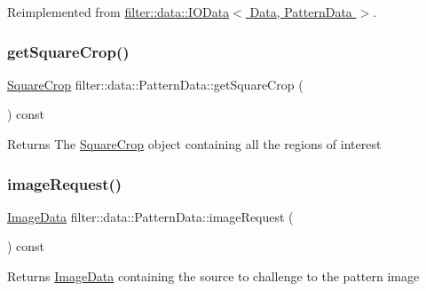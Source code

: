 Reimplemented from \hyperlink{classfilter_1_1data_1_1_i_o_data}{filter\+::data\+::\+I\+O\+Data$<$ Data, Pattern\+Data $>$}.

\mbox{\label{classfilter_1_1data_1_1_pattern_data_ad51b9505b78d94b5fac9e4afa83c087e}} 
\subsubsection{\texorpdfstring{get\+Square\+Crop()}{getSquareCrop()}}
{\footnotesize\ttfamily \hyperlink{classfilter_1_1data_1_1_square_crop}{Square\+Crop} filter\+::data\+::\+Pattern\+Data\+::get\+Square\+Crop (\begin{DoxyParamCaption}{ }\end{DoxyParamCaption}) const\hspace{0.3cm}{\ttfamily [inline]}}

\begin{DoxyReturn}{Returns}
The \hyperlink{classfilter_1_1data_1_1_square_crop}{Square\+Crop} object containing all the regions of interest 
\end{DoxyReturn}
\mbox{\label{classfilter_1_1data_1_1_pattern_data_aa7f53d24f4a732739d815b48694c629f}} 
\subsubsection{\texorpdfstring{image\+Request()}{imageRequest()}}
{\footnotesize\ttfamily \hyperlink{classfilter_1_1data_1_1_image_data}{Image\+Data} filter\+::data\+::\+Pattern\+Data\+::image\+Request (\begin{DoxyParamCaption}{ }\end{DoxyParamCaption}) const\hspace{0.3cm}{\ttfamily [inline]}}

\begin{DoxyReturn}{Returns}
\hyperlink{classfilter_1_1data_1_1_image_data}{Image\+Data} containing the source to challenge to the pattern image 
\end{DoxyReturn}
\mbox{\label{classfilter_1_1data_1_1_pattern_data_a5c6093f1ee788fc87a3835ffea7d46b4}} 
